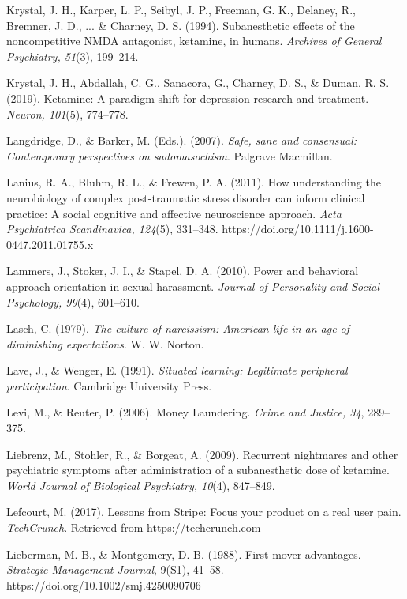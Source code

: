 \begin{thebibliography}{}
    Krystal, J. H., Karper, L. P., Seibyl, J. P., Freeman, G. K., Delaney, R., Bremner, J. D., ... \& Charney, D. S. (1994). Subanesthetic effects of the noncompetitive NMDA antagonist, ketamine, in humans. \textit{Archives of General Psychiatry, 51}(3), 199–214.

    Krystal, J. H., Abdallah, C. G., Sanacora, G., Charney, D. S., \& Duman, R. S. (2019). Ketamine: A paradigm shift for depression research and treatment. \textit{Neuron, 101}(5), 774–778.


    Langdridge, D., \& Barker, M. (Eds.). (2007). \textit{Safe, sane and consensual: Contemporary perspectives on sadomasochism}. Palgrave Macmillan.

    Lanius, R. A., Bluhm, R. L., \& Frewen, P. A. (2011). How understanding the neurobiology of complex post-traumatic stress disorder can inform clinical practice: A social cognitive and affective neuroscience approach. \textit{Acta Psychiatrica Scandinavica, 124}(5), 331–348. https://doi.org/10.1111/j.1600-0447.2011.01755.x

    Lammers, J., Stoker, J. I., \& Stapel, D. A. (2010). Power and behavioral approach orientation in sexual harassment. \textit{Journal of Personality and Social Psychology, 99}(4), 601–610.

    Lasch, C. (1979). \textit{The culture of narcissism: American life in an age of diminishing expectations}. W. W. Norton.
    
    Lave, J., \& Wenger, E. (1991). \textit{Situated learning: Legitimate peripheral participation}. Cambridge University Press.

    Levi, M., \& Reuter, P. (2006). Money Laundering. \textit{Crime and Justice, 34}, 289–375.

    Liebrenz, M., Stohler, R., \& Borgeat, A. (2009). Recurrent nightmares and other psychiatric symptoms after administration of a subanesthetic dose of ketamine. \textit{World Journal of Biological Psychiatry, 10}(4), 847–849.

    Lefcourt, M. (2017). Lessons from Stripe: Focus your product on a real user pain. \textit{TechCrunch}. Retrieved from \url{https://techcrunch.com}

    Lieberman, M. B., \& Montgomery, D. B. (1988). First-mover advantages. \textit{Strategic Management Journal}, 9(S1), 41–58. https://doi.org/10.1002/smj.4250090706


\end{thebibliography}
